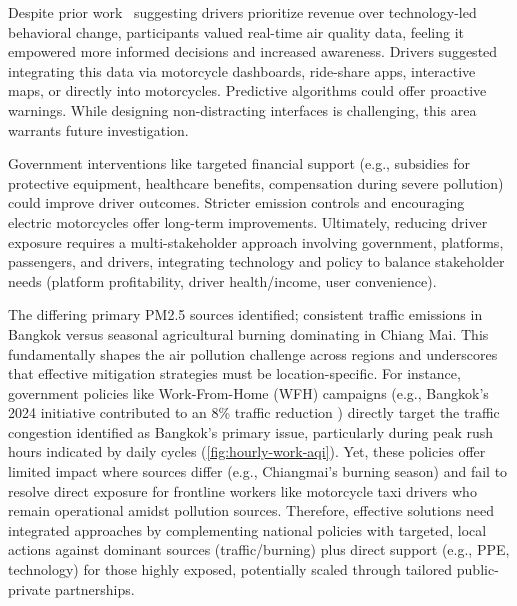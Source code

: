 \documentclass[sigconf,screen,natbib=true]{acmart}
\providecommand{\DIFadd}[1]{{\protect\color{blue}\uwave{#1}}} %
\providecommand{\DIFaddbegin}{} %
\providecommand{\DIFaddend}{} %
\begin{document}
Despite prior work~\cite{tieanklin2024rideshare} suggesting drivers prioritize revenue over technology-led behavioral change, participants valued real-time air quality data, feeling it empowered more informed decisions and increased awareness.
Drivers suggested integrating this data via motorcycle dashboards, ride-share apps, interactive maps, or directly into motorcycles.
Predictive algorithms could offer proactive warnings.
While designing non-distracting interfaces is challenging, this area warrants future investigation.



Government interventions like targeted financial support (e.g., subsidies for protective equipment, healthcare benefits, compensation during severe pollution) could improve driver outcomes.
Stricter emission controls and encouraging electric motorcycles offer long-term improvements.
Ultimately, reducing driver exposure requires a multi-stakeholder approach involving government, platforms, passengers, and drivers, integrating technology and policy to balance stakeholder needs (platform profitability, driver health/income, user convenience).

The differing primary PM2.5 sources \DIFaddbegin \DIFadd{were }\DIFaddend identified; consistent traffic emissions in Bangkok versus seasonal agricultural burning dominating in Chiang Mai. 
This fundamentally shapes the air pollution challenge across regions and underscores that effective mitigation strategies must be location-specific. 
For instance, government policies like Work-From-Home (WFH) campaigns (e.g., Bangkok's 2024 initiative contributed to an 8\% traffic reduction  \cite{Wipatayotin_2025}) directly target the traffic congestion identified as Bangkok's primary issue, particularly during peak rush hours indicated by daily cycles (\autoref{fig:hourly-work-aqi}). 
Yet, these policies offer limited impact where sources differ (e.g., Chiangmai's burning season) and fail to resolve direct exposure for frontline workers like motorcycle taxi drivers who remain operational amidst pollution sources.
Therefore, effective solutions need integrated approaches by complementing national policies with targeted, local actions against dominant sources (traffic/burning) plus direct support (e.g., PPE, technology) for those highly exposed, potentially scaled through tailored public-private partnerships.
\end{document}
